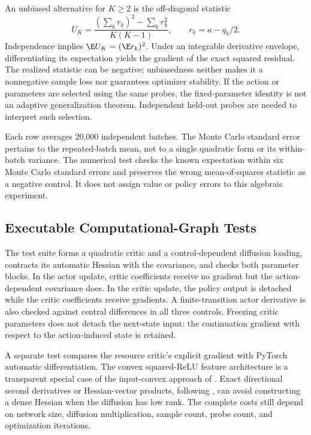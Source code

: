 An unbiased alternative for $K\geq2$ is the off-diagonal statistic
\[
 U_K=\frac{(\sum_kr_k)^2-\sum_kr_k^2}{K(K-1)},\qquad r_k=a-q_k/2.
\]
Independence implies $\E U_K=(\E r_k)^2$. Under an integrable derivative envelope, differentiating its expectation yields the gradient of the exact squared residual. The realized statistic can be negative; unbiasedness neither makes it a nonnegative sample loss nor guarantees optimizer stability. If the action or parameters are selected using the same probes, the fixed-parameter identity is not an adaptive generalization theorem. Independent held-out probes are needed to interpret such selection.



Each row averages 20,000 independent batches. The Monte Carlo standard error pertains to the repeated-batch mean, not to a single quadratic form or its within-batch variance. The numerical test checks the known expectation within six Monte Carlo standard errors and preserves the wrong mean-of-squares statistic as a negative control. It does not assign value or policy errors to this algebraic experiment.

\subsection{Executable Computational-Graph Tests}
The test suite forms a quadratic critic and a control-dependent diffusion loading, contracts its automatic Hessian with the covariance, and checks both parameter blocks. In the actor update, critic coefficients receive no gradient but the action-dependent covariance does. In the critic update, the policy output is detached while the critic coefficients receive gradients. A finite-transition actor derivative is also checked against central differences in all three controls. Freezing critic parameters does not detach the next-state input: the continuation gradient with respect to the action-induced state is retained.

A separate test compares the resource critic's explicit gradient with PyTorch automatic differentiation. The convex squared-ReLU feature architecture is a transparent special case of the input-convex approach of \citet{amos2017}. Exact directional second derivatives or Hessian-vector products, following \citet{pearlmutter1994}, can avoid constructing a dense Hessian when the diffusion has low rank. The complete costs still depend on network size, diffusion multiplication, sample count, probe count, and optimization iterations.
